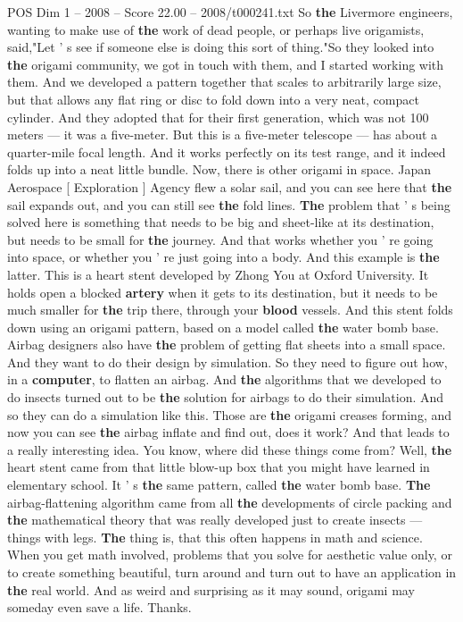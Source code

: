 \begin{textsample}{POS Dim 1 – 2008 – Score 22.00 – 2008/t000241.txt}
So \textbf{the} Livermore engineers, wanting to make use of \textbf{the} work of dead people, or perhaps live origamists, said,"Let ' s see if someone else is doing this sort of thing."So they looked into \textbf{the} origami community, we got in touch with them, and I started working with them.
And we developed a pattern together that scales to arbitrarily large size, but that allows any flat ring or disc to fold down into a very neat, compact cylinder.
And they adopted that for their first generation, which was not 100 meters — it was a five-meter.
But this is a five-meter telescope — has about a quarter-mile focal length.
And it works perfectly on its test range, and it indeed folds up into a neat little bundle.
Now, there is other origami in space.
Japan Aerospace [ Exploration ] Agency flew a solar sail, and you can see here that \textbf{the} sail expands out, and you can still see \textbf{the} fold lines. \textbf{The} problem that ' s being solved here is something that needs to be big and sheet-like at its destination, but needs to be small for \textbf{the} journey.
And that works whether you ' re going into space, or whether you ' re just going into a body.
And this example is \textbf{the} latter.
This is a heart stent developed by Zhong You at Oxford University.
It holds open a blocked \textbf{artery} when it gets to its destination, but it needs to be much smaller for \textbf{the} trip there, through your \textbf{blood} vessels.
And this stent folds down using an origami pattern, based on a model called \textbf{the} water bomb base.
Airbag designers also have \textbf{the} problem of getting flat sheets into a small space.
And they want to do their design by simulation.
So they need to figure out how, in a \textbf{computer}, to flatten an airbag.
And \textbf{the} algorithms that we developed to do insects turned out to be \textbf{the} solution for airbags to do their simulation.
And so they can do a simulation like this.
Those are \textbf{the} origami creases forming, and now you can see \textbf{the} airbag inflate and find out, does it work?
And that leads to a really interesting idea.
You know, where did these things come from?
Well, \textbf{the} heart stent came from that little blow-up box that you might have learned in elementary school.
It ' s \textbf{the} same pattern, called \textbf{the} water bomb base. \textbf{The} airbag-flattening algorithm came from all \textbf{the} developments of circle packing and \textbf{the} mathematical theory that was really developed just to create insects — things with legs. \textbf{The} thing is, that this often happens in math and science.
When you get math involved, problems that you solve for aesthetic value only, or to create something beautiful, turn around and turn out to have an application in \textbf{the} real world.
And as weird and surprising as it may sound, origami may someday even save a life.
Thanks.

\end{textsample}
